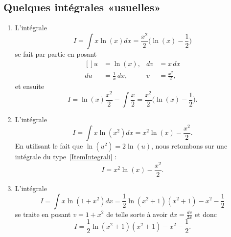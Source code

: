 \subsection{Quelques intégrales «usuelles»}

\begin{enumerate}
	\item	\label{ItemIntegrali}
	      L'intégrale
	      \begin{equation}
		      \boxed{I=\int x\ln(x)dx=\frac{ x^2 }{2}\big( \ln(x)-\frac{ 1 }{2} \big)}
	      \end{equation}
	      se fait par partie en posant
	      \begin{equation}
		      \begin{aligned}[]
			      u  & =\ln(x),            & dv & =x\,dx            \\
			      du & =\frac{1}{ x }\,dx, & v  & =\frac{ x^2 }{2},
		      \end{aligned}
	      \end{equation}
	      et ensuite
	      \begin{equation}
		      I=\ln(x)\frac{ x^2 }{2}-\int\frac{ x }{2}=\frac{ x^2 }{2}\big( \ln(x)-\frac{ 1 }{2} \big).
	      \end{equation}

	\item
	      L'intégrale
	      \begin{equation}
		      \boxed{I=\int x\ln(x^2)dx=x^2\ln(x)-\frac{ x^2 }{2}.}
	      \end{equation}
	      En utilisant le fait que \( \ln(u^2)=2\ln(u)\), nous retombons sur une intégrale du type~\ref{ItemIntegrali} :
	      \begin{equation}
		      I=x^2\ln(x)-\frac{ x^2 }{2}.
	      \end{equation}
	\item
	      L'intégrale
	      \begin{equation}		\label{EqTrucIntxlnxsqpun}
		      \boxed{I=\int x\ln(1+x^2)dx=\frac{ 1 }{2}\ln(x^2+1)(x^2+1)-x^2-\frac{ 1 }{2}}
	      \end{equation}
	      se traite en posant \( v=1+x^2\) de telle sorte à avoir \( dx=\frac{ dv }{ 2x }\) et donc
	      \begin{equation}
		      I=\frac{ 1 }{2}\ln(x^2+1)(x^2+1)-x^2-\frac{ 1 }{2}.
	      \end{equation}


\end{enumerate}
